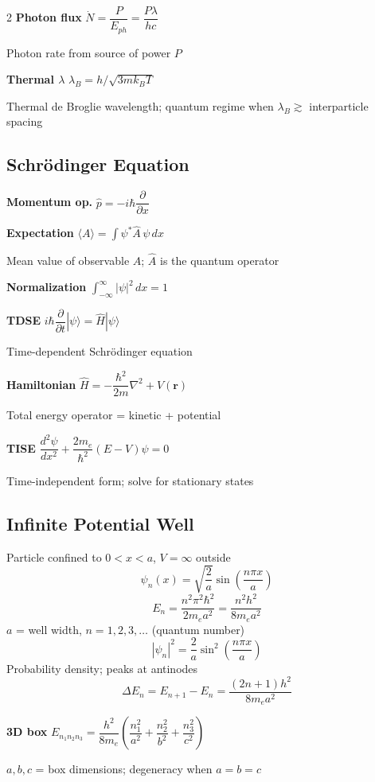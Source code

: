 \documentclass[9pt]{extarticle}
\newcommand{\eqlabel}[1]{\textbf{\scriptsize #1}\;}
\newcommand{\desc}[1]{{\small\color{desc}#1}}
\begin{document}
\begin{multicols}{2}
\eqlabel{Photon flux} $\dot{N} = \dfrac{P}{E_{ph}} = \dfrac{P\lambda}{hc}$

\desc{Photon rate from source of power $P$}

\eqlabel{Thermal $\lambda$} $\lambda_B = h/\sqrt{3mk_BT}$

\desc{Thermal de Broglie wavelength; quantum regime when $\lambda_B \gtrsim$ interparticle spacing}

\subsection{Schr\"odinger Equation}
\eqlabel{Momentum op.}
$\hat{p} = -i\hbar\dfrac{\partial}{\partial x}$

\eqlabel{Expectation}
$\langle A \rangle = \displaystyle\int \psi^* \hat{A}\,\psi\,dx$

\desc{Mean value of observable $A$; $\hat{A}$ is the quantum operator}

\eqlabel{Normalization}
$\displaystyle\int_{-\infty}^{\infty}|\psi|^2\,dx = 1$

\eqlabel{TDSE}
$i\hbar\dfrac{\partial}{\partial t}|\psi\rangle = \hat{H}|\psi\rangle$

\desc{Time-dependent Schr\"odinger equation}

\eqlabel{Hamiltonian}
$\hat{H} = -\dfrac{\hbar^2}{2m}\nabla^2 + V(\mathbf{r})$

\desc{Total energy operator = kinetic + potential}

\eqlabel{TISE}
$\dfrac{d^2\psi}{dx^2} + \dfrac{2m_e}{\hbar^2}(E - V)\psi = 0$

\desc{Time-independent form; solve for stationary states}

\subsection{Infinite Potential Well}
\desc{Particle confined to $0 < x < a$, $V = \infty$ outside}
\[\psi_n(x) = \sqrt{\frac{2}{a}}\sin\!\left(\frac{n\pi x}{a}\right)\]
\[E_n = \frac{n^2\pi^2\hbar^2}{2m_ea^2} = \frac{n^2 h^2}{8m_ea^2}\]
\desc{$a$ = well width, $n = 1,2,3,\ldots$ (quantum number)}
\[|\psi_n|^2 = \frac{2}{a}\sin^2\!\left(\frac{n\pi x}{a}\right)\]
\desc{Probability density; peaks at antinodes}
\[\Delta E_n = E_{n+1} - E_n = \frac{(2n+1)h^2}{8m_ea^2}\]

\eqlabel{3D box}
$E_{n_1n_2n_3} = \dfrac{h^2}{8m_e}\!\left(\dfrac{n_1^2}{a^2}+\dfrac{n_2^2}{b^2}+\dfrac{n_3^2}{c^2}\right)$

\desc{$a,b,c$ = box dimensions; degeneracy when $a=b=c$}


\end{multicols}
\end{document}
